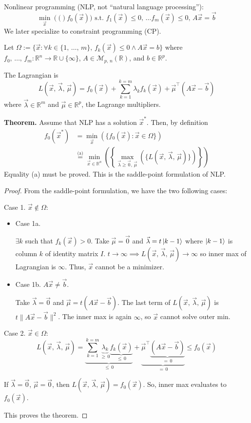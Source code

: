 \documentclass{article}
\newcommand{\R}{\mathbb{R}}             %
\newcommand{\M}{\mathcal{M}}            %
\newcommand{\x}{\vec{x}}                %
\newcommand{\rl}[1]{\left(#1\right)}
\begin{document}
Nonlinear programming (NLP, not ``natural language processing''):
\[
    \min_{\x}\rl(f_0(\x)) \text{ s.t. } f_1(\x) \leq 0,\, \ldots f_m(\x) \leq 0,\, A\x = \vec{b}
\]
We later specialize to constraint programming (CP).

Let $\Omega := \{\x : \forall k \in \{1,\, \ldots,\, m\},\, f_k(\x) \leq 0 \wedge A\x = b\}$ where $f_0,\, \ldots,\, f_m \colon \R^n \to \R \cup \{\infty\}$, $A \in \M_{p,\, n}(\R)$, and $b \in \R^p$.

The Lagrangian is
\[
    L\rl{\x,\, \vec{\lambda},\, \vec{\mu}} = f_0(\x) + \sum_{k = 1}^{k = m}\lambda_k f_k(\x) + \vec{\mu}^\top(A\x - \vec{b})
\]
where $\vec{\lambda} \in \R^m$ and $\vec{\mu} \in \R^p$, the Lagrange multipliers.

\textbf{Theorem.} Assume that NLP has a solution $\x^*$. Then, by definition
\begin{align*}
    f_0(\x^*) &= \min_{\x}\rl{\{f_0(\x) : \x \in \Omega\}} \\
    &\overset{\text{(a)}}{=} \min_{\x \in \R^n}\rl{\left\{\max_{\vec{\lambda} \geq \vec{0},\, \vec{\mu}}\rl{\{L\rl{\x,\, \vec{\lambda},\, \vec{\mu}}\}}\right\}}
\end{align*}
Equality (a) must be proved. This is the saddle-point formulation of NLP.

\begin{proof}
    From the saddle-point formulation, we have the two following cases:

    Case 1. $\x \notin \Omega$:
    \begin{itemize}
        \item Case 1a.

        $\exists k$ such that $f_k(\x) > 0$. Take $\vec{\mu} = \vec{0}$ and $\vec{\lambda} = t\ket{k - 1}$ where $\ket{k - 1}$ is column $k$ of identity matrix $I$. $t \to \infty \implies L\rl{\x,\, \vec{\lambda},\, \vec{\mu}} \to \infty$ so inner max of Lagrangian is $\infty$. Thus, $\x$ cannot be a minimizer.

        \item Case 1b. $A\x \neq \vec{b}$.

        Take $\vec{\lambda} = \vec{0}$ and $\vec{\mu} = t(A\x - \vec{b})$. The last term of $L\rl{\x,\, \vec{\lambda},\, \vec{\mu}}$ is $t\|A\x - \vec{b}\|^2$. The inner max is again $\infty$, so $\x$ cannot solve outer min.
    \end{itemize}

    Case 2. $\x \in \Omega$:
    \[
        L\rl{\x,\, \vec{\lambda},\, \vec{\mu}} = \underbrace{\sum_{k = 1}^{k = m} \underbrace{\lambda_k}_{\geq\, 0} \underbrace{f_k(\x)}_{\leq\, 0}}_{\leq\, 0} + \underbrace{\vec{\mu}^\top\underbrace{(A\x - \vec{b})}_{=\, 0}}_{=\, 0} \leq f_0(\x)
    \]

    If $\vec{\lambda} = \vec{0}$, $\vec{\mu} = \vec{0}$, then $L\rl{\x,\, \vec{\lambda},\, \vec{\mu}} = f_0(\x)$. So, inner max evaluates to $f_0(\x)$.

    This proves the theorem.
\end{proof}
\end{document}
